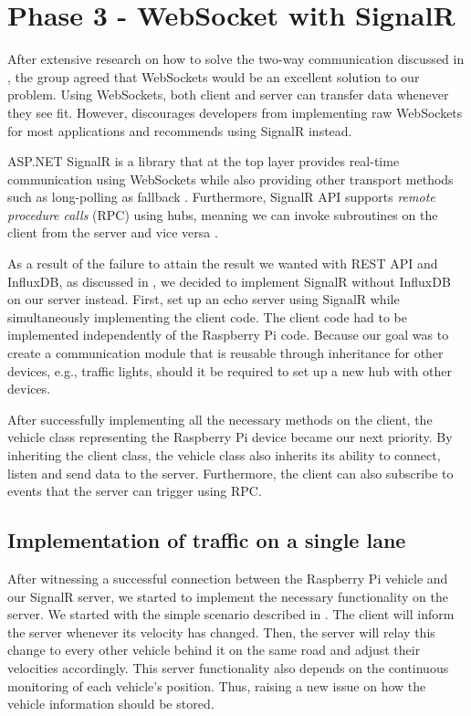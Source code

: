 \section{Phase 3 - WebSocket with SignalR}\label{phase3}
After extensive research on how to solve the two-way communication discussed in , the group agreed that WebSockets would be an excellent solution to our problem. Using WebSockets, both client and server can transfer data whenever they see fit. However, \cite{microsoft_websockets} discourages developers from implementing raw WebSockets for most applications and recommends using SignalR instead.

ASP.NET SignalR is a library that at the top layer provides real-time communication using WebSockets while also providing other transport methods such as long-polling as fallback \parencite{microsoft_signalr}. Furthermore, SignalR API supports \emph{remote procedure calls} (RPC) using hubs, meaning we can invoke subroutines on the client from the server and vice versa \parencite{microsoft_signalr}.

As a result of the failure to attain the result we wanted with REST API and InfluxDB, as discussed in , we decided to implement SignalR without InfluxDB on our server instead. First, set up an echo server using SignalR while simultaneously implementing the client code. The client code had to be implemented independently of the Raspberry Pi code. Because our goal was to create a communication module that is reusable through inheritance for other devices, e.g., traffic lights, should it be required to set up a new hub with other devices.

After successfully implementing all the necessary methods on the client, the vehicle class representing the Raspberry Pi device became our next priority. By inheriting the client class, the vehicle class also inherits its ability to connect, listen and send data to the server. Furthermore, the client can also subscribe to events that the server can trigger using RPC.

\subsection{Implementation of traffic on a single lane}
After witnessing a successful connection between the Raspberry Pi vehicle and our SignalR server, we started to implement the necessary functionality on the server. We started with the simple scenario described in . The client will inform the server whenever its velocity has changed. Then, the server will relay this change to every other vehicle behind it on the same road and adjust their velocities accordingly. This server functionality also depends on the continuous monitoring of each vehicle's position. Thus, raising a new issue on how the vehicle information should be stored.

